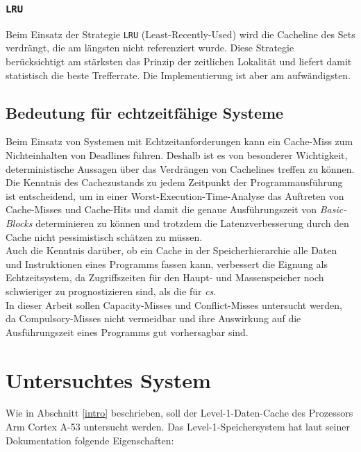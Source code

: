 \documentclass[]{scrbook}
\begin{document}
\subsubsection{\texttt{LRU}}

Beim Einsatz der Strategie \texttt{LRU} (Least-Recently-Used) wird die Cacheline des Sets verdrängt, die am längsten nicht referenziert wurde.
Diese Strategie berücksichtigt am stärksten das Prinzip der zeitlichen Lokalität und liefert damit statistisch die beste Trefferrate.
Die Implementierung ist aber am aufwändigsten.

\subsection{Bedeutung für echtzeitfähige Systeme}

Beim Einsatz von Systemen mit Echtzeitanforderungen kann ein Cache-Miss zum Nichteinhalten von Deadlines führen.
Deshalb ist es von besonderer Wichtigkeit, deterministische Aussagen über das Verdrängen von Cachelines treffen zu können. 
Die Kenntnis des Cachezustands zu jedem Zeitpunkt der Programmausführung ist entscheidend, um in einer Worst-Execution-Time-Analyse das Auftreten von Cache-Misses und Cache-Hits und damit die genaue Ausführungszeit von \textsl{Basic-Blocks} determinieren zu können und trotzdem die Latenzverbesserung durch den Cache nicht pessimistisch schätzen zu müssen. \cite{wcet}
\\
Auch die Kenntnis darüber, ob ein Cache in der Speicherhierarchie alle Daten und Instruktionen eines Programms fassen kann, verbessert die Eignung als Echtzeitsystem, da Zugriffszeiten für den Haupt- und Massenspeicher noch schwieriger zu prognostizieren sind, als die für \textsl{\glspl{c}}.
\\  
In dieser Arbeit sollen Capa\-city-Misses und Con\-flict-Misses untersucht werden, da {Com\-pulsory}-Misses nicht vermeidbar und ihre Auswirkung auf die Ausführungszeit eines Programms gut vorhersagbar sind.

\section{Untersuchtes System}

Wie in Abschnitt \ref{intro} beschrieben, soll der Level-1-Daten-Cache des Prozessors Arm Cortex A-53 untersucht werden. 
Das Level-1-Speichersystem hat laut seiner Dokumentation \cite{a53trm} folgende Eigenschaften:
\end{document}
